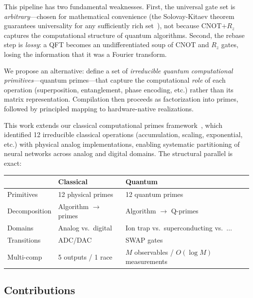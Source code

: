 \documentclass[11pt]{article}
\begin{document}
This pipeline has two fundamental weaknesses. First, the universal gate set is \textit{arbitrary}---chosen for mathematical convenience (the Solovay-Kitaev theorem guarantees universality for any sufficiently rich set~\cite{solovay}), not because CNOT$+R_z$ captures the computational structure of quantum algorithms. Second, the rebase step is \textit{lossy}: a QFT becomes an undifferentiated soup of CNOT and $R_z$ gates, losing the information that it was a Fourier transform.

We propose an alternative: define a set of \textit{irreducible quantum computational primitives}---quantum primes---that capture the computational \textit{role} of each operation (superposition, entanglement, phase encoding, etc.) rather than its matrix representation. Compilation then proceeds as factorization into primes, followed by principled mapping to hardware-native realizations.

This work extends our classical computational primes framework~\cite{bieg_primes}, which identified 12 irreducible classical operations (accumulation, scaling, exponential, etc.) with physical analog implementations, enabling systematic partitioning of neural networks across analog and digital domains. The structural parallel is exact:

\begin{center}
\begin{tabular}{lll}
\toprule
& Classical & Quantum \\
\midrule
Primitives & 12 physical primes & 12 quantum primes \\
Decomposition & Algorithm $\to$ primes & Algorithm $\to$ Q-primes \\
Domains & Analog vs.\ digital & Ion trap vs.\ superconducting vs.\ $\ldots$ \\
Transitions & ADC/DAC & SWAP gates \\
Multi-comp & 5 outputs / 1 race & $M$ observables / $O(\log M)$ measurements \\
\bottomrule
\end{tabular}
\end{center}

\subsection{Contributions}
\end{document}
